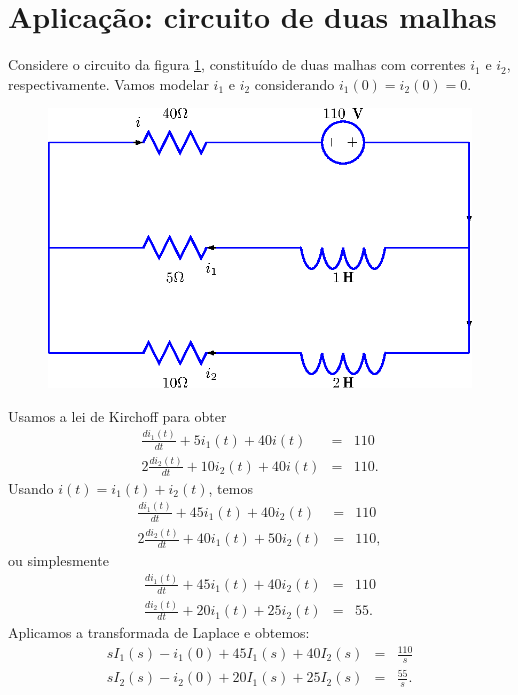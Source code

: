 \section{Aplicação: circuito de duas malhas}
Considere o circuito da figura \ref{fig_circ_2_malha}, constituído de duas malhas com correntes $i_1$ e $i_2$, respectivamente. Vamos modelar $i_1$ e $i_2$ considerando $i_1(0)=i_2(0)=0$. 
\begin{figure}[!ht]
\begin{center}

\includegraphics{cap_sistemas/pics/figura_1}\end{center}
\caption{\label{fig_circ_2_malha}}
\end{figure}
Usamos a lei de Kirchoff para obter
\begin{eqnarray*}
\frac{di_1(t)}{dt}+5i_1(t)+40i(t)&=&110\\
2\frac{di_2(t)}{dt}+10i_2(t)+40i(t)&=&110 .
\end{eqnarray*}
Usando $i(t)=i_1(t)+i_2(t)$, temos
\begin{eqnarray*}
\frac{di_1(t)}{dt}+45i_1(t)+40i_2(t)&=&110\\
2\frac{di_2(t)}{dt}+40i_1(t)+50i_2(t)&=&110 ,
\end{eqnarray*}
ou simplesmente
\begin{eqnarray*}
\frac{di_1(t)}{dt}+45i_1(t)+40i_2(t)&=&110\\
\frac{di_2(t)}{dt}+20i_1(t)+25i_2(t)&=&55 .
\end{eqnarray*}
Aplicamos a transformada de Laplace e obtemos:
\begin{eqnarray*}
sI_1(s)-i_1(0)+45I_1(s)+40I_2(s)&=&\frac{110}{s}\\
sI_2(s)-i_2(0)+20I_1(s)+25I_2(s)&=&\frac{55}{s} .
\end{eqnarray*}
